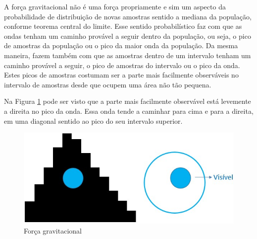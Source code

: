 A força gravitacional não é uma força propriamente e sim um aspecto da probabilidade de distribuição de novas amostras sentido a mediana da população, conforme teorema central do limite. Esse sentido probabilístico faz com que as ondas tenham um caminho provável a seguir dentro da população, ou seja, o pico de amostras da população ou o pico da maior onda da população. Da mesma maneira, fazem também com que as amostras dentro de um intervalo tenham um caminho provável a seguir, o pico de amostras do intervalo ou o pico da onda. Estes picos de amostras costumam ser a parte mais facilmente observáveis no intervalo de amostras desde que ocupem uma área não tão pequena.

Na Figura \ref{fig:consciousness_gravitational_force} pode ser visto que a parte mais facilmente observável está levemente a direita no pico da onda. Essa onda tende a caminhar para cima e para a direita, em uma diagonal sentido ao pico do seu intervalo superior. 
	\begin{figure}[H]
	\caption{Força gravitacional}
	\label{fig:consciousness_gravitational_force}
	\centering
	\includegraphics[scale=.7]{sections/images/consciousness_gravitational_force.jpg}
	\end{figure}

